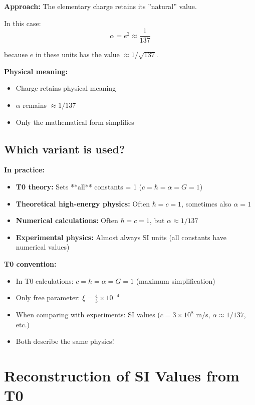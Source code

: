 	\textbf{Approach:} The elementary charge retains its ''natural'' value.
	
	In this case:
	\begin{equation}
		\alpha = e^2 \approx \frac{1}{137}
	\end{equation}
	
	because $e$ in these units has the value $\approx 1/\sqrt{137}$.
	
	\textbf{Physical meaning:}
	\begin{itemize}
		\item Charge retains physical meaning
		\item $\alpha$ remains $\approx 1/137$
		\item Only the mathematical form simplifies
	\end{itemize}
	
	\subsection{Which variant is used?}
	
	\textbf{In practice:}
	\begin{itemize}
		\item \textbf{T0 theory:} Sets **all** constants = 1 ($c = \hbar = \alpha = G = 1$)
		\item \textbf{Theoretical high-energy physics:} Often $\hbar = c = 1$, sometimes also $\alpha = 1$
		\item \textbf{Numerical calculations:} Often $\hbar = c = 1$, but $\alpha \approx 1/137$
		\item \textbf{Experimental physics:} Almost always SI units (all constants have numerical values)
	\end{itemize}
	
	\textbf{T0 convention:}
	\begin{itemize}
		\item In T0 calculations: $c = \hbar = \alpha = G = 1$ (maximum simplification)
		\item Only free parameter: $\xi = \frac{4}{3} \times 10^{-4}$
		\item When comparing with experiments: SI values ($c = 3 \times 10^8$ m/s, $\alpha \approx 1/137$, etc.)
		\item Both describe the same physics!
	\end{itemize}
	
	\section{Reconstruction of SI Values from T0}
	\label{sec:si_reconstruction}
	
